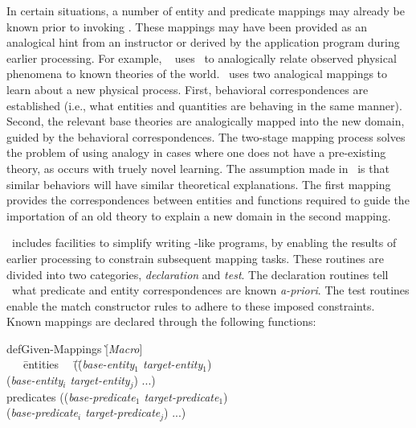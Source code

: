 In certain situations, a number of entity and predicate mappings may already
be known prior to invoking \SME. These mappings may have been provided as an
analogical hint from an instructor or derived by the
application program during earlier processing.  For example, \Phineas\
\cite{VBAL,MLW} uses \SME\ to analogically relate observed physical
phenomena to known theories of the world. \Phineas\ uses two analogical
mappings to learn about a new physical process. First, behavioral
correspondences are established (i.e., what entities and quantities are
behaving in the same manner). Second, the relevant base theories are
analogically mapped into the new domain, guided by the behavioral
correspondences. The two-stage mapping process solves the problem of using
analogy in cases where one does not have a pre-existing theory, as occurs
with truely novel learning. The assumption made in \Phineas\ is that similar
behaviors will have similar theoretical explanations. The first mapping
provides the correspondences between entities and functions required to
guide the importation of an old theory to explain a new domain in the second
mapping.

\SME\ includes facilities to simplify writing \Phineas-like programs, by
enabling the results of earlier processing to constrain subsequent mapping
tasks. These routines are divided into two categories, {\it declaration} and
{\it test}. The declaration routines tell \SME\ what predicate and entity
correspondences are known {\it a-priori}. The test routines enable the match
constructor rules to adhere to these imposed constraints. Known mappings are
declared through the following functions:

\noindent
\begin{minipage}{\textwidth}
\begin{tt}
\begin{tabbing}
defGiven-Mappings  \` [{\it Macro}]   \\
\ \ \ \= entities \ \ \= (\= ({\it base-entity$_{1}$ target-entity$_{1}$})   \\
      \>              \>  \> ({\it base-entity$_{i}$ target-entity$_{j}$}) ...)  \\
      \> predicates   \> (({\it base-predicate$_{1}$ target-predicate$_{1}$})   \\
      \>              \>  \> ({\it base-predicate$_{i}$ target-predicate$_{j}$}) ...)
\end{tabbing}
\end{tt}
\end{minipage}

